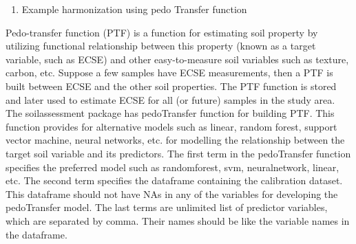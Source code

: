 \documentclass[
  10pt,
  b5paper,
]{book}
\newenvironment{Shaded}{\begin{snugshade}}{\end{snugshade}}
\newcommand{\CommentTok}[1]{\textcolor[rgb]{0.56,0.35,0.01}{\textit{#1}}}
\newcommand{\KeywordTok}[1]{\textcolor[rgb]{0.13,0.29,0.53}{\textbf{#1}}}
\newcommand{\NormalTok}[1]{#1}
\newcommand{\OperatorTok}[1]{\textcolor[rgb]{0.81,0.36,0.00}{\textbf{#1}}}
\newcommand{\StringTok}[1]{\textcolor[rgb]{0.31,0.60,0.02}{#1}}
\providecommand{\tightlist}{%
  \setlength{\itemsep}{0pt}\setlength{\parskip}{0pt}}
\begin{document}
\begin{Shaded}
\end{Shaded}

\begin{enumerate}
\def\labelenumi{(\arabic{enumi})}
\setcounter{enumi}{1}
\tightlist
\item
  Example harmonization using pedo Transfer function
\end{enumerate}

Pedo-transfer function (PTF) is a function for estimating soil property by utilizing functional relationship between this property (known as a target variable, such as ECSE) and other easy-to-measure soil variables such as texture, carbon, etc. Suppose a few samples have ECSE measurements, then a PTF is built between ECSE and the other soil properties. The PTF function is stored and later used to estimate ECSE for all (or future) samples in the study area. The soilassessment package has pedoTransfer function for building PTF. This function provides for alternative models such as linear, random forest, support vector machine, neural networks, etc. for modelling the relationship between the target soil variable and its predictors. The first term in the pedoTransfer function specifies the preferred model such as randomforest, svm, neuralnetwork, linear, etc. The second term specifies the dataframe containing the calibration dataset. This dataframe should not have NAs in any of the variables for developing the pedoTransfer model. The last terms are unlimited list of predictor variables, which are separated by comma. Their names should be like the variable names in the dataframe.
\end{document}
